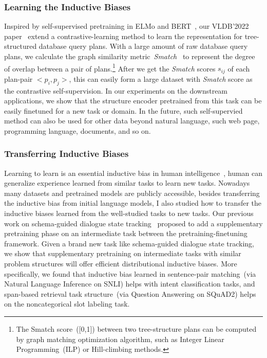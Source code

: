 \subsubsection{Learning the Inductive Biases}
\label{sssec:future:learn-biases}
Inspired by self-supervised pretraining in ELMo and
BERT~\cite{devlin2019bert}, our VLDB'2022
paper~\cite{paul2021database} extend a contrastive-learning method to
learn the representation for tree-structured database query
plans. With a large amount of raw database query plans, we calculate
the graph similarity metric~{\em Smatch}~\cite{Cai:2013wn} to
represent the degree of overlap between a pair of plans.\footnote{The
  Smatch score~([0,1]) between two tree-structure plans can be
  computed by graph matching optimization algorithm, such as Integer
  Linear Programming~(ILP) or Hill-climbing methods.}  After we get
the {\em Smatch} scores $s_{ij}$ of each plan-pair $<p_{i}, p_{j}>$,
this can easily form a large dataset with {\em Smatch} score as the
contrastive self-supervision. In our experiments on the downstream
applications, we show that the structure encoder pretrained from this
task can be easily finetuned for a new task or domain. In the future,
such self-supervied method can also be used for other data beyond
natural language, such web page, programming language, documents, and
so on.

\subsubsection{Transferring Inductive Biases}
\label{sssec:future:transfer-biases}
Learning to learn is an essential inductive bias in human
intelligence~\cite{harlow1949formation}, human can generalize
experience learned from similar tasks to learn new tasks. Nowadays
many datasets and pretrained models are publicly accessible, besides
transferring the inductive bias from initial language models, I also
studied how to transfer the inductive biases learned from the
well-studied tasks to new tasks. Our previous work on schema-guided
dialogue state tracking~\cite{cao2021schema} proposed to add a
supplementary pretraining phase on an intermediate task between the
pretraining-finetuning framework. Given a brand new task like
schema-guided dialogue state tracking, we show that supplementary
pretraining on intermediate tasks with similar problem structures will
offer efficient distributional inductive biases. More specifically, we
found that inductive bias learned in sentence-pair matching~(via
Natural Language Inference on SNLI) helps with intent classification
tasks, and span-based retrieval task structure~(via Question Answering
on SQuAD2) helps on the noncategorical slot labeling task.


